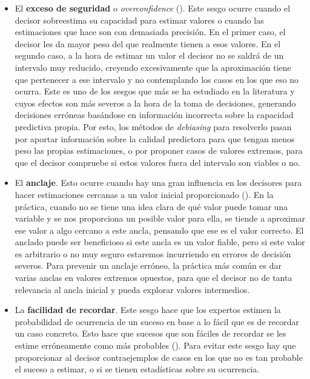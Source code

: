 \documentclass[a4paper,11pt]{article}
\begin{document}
\begin{itemize}
\item El \textbf{exceso de seguridad} o \textit{overconfidence} (\cite{moore2008}). Este sesgo ocurre cuando el decisor sobreestima su capacidad para estimar valores o cuando las estimaciones que hace son con demasiada precisión. En el primer caso, el decisor les da mayor peso del que realmente tienen a esos valores. En el segundo caso, a la hora de estimar un valor el decisor no se saldrá de un intervalo muy reducido, creyendo excesivamente que la aproximación tiene que pertenecer a ese intervalo y no contemplando los casos en los que eso no ocurra. 
Este es uno de los sesgos que más se ha estudiado en la literatura y cuyos efectos son más severos a la hora de la toma de decisiones, generando decisiones erróneas basándose en información incorrecta sobre la capacidad predictiva propia. Por esto, los métodos de \textit{debiasing} para resolverlo pasan por aportar información sobre la calidad predictora para que tengan menos peso las propias estimaciones, o por proponer casos de valores extremos, para que el decisor compruebe si estos valores fuera del intervalo son viables o no.

\item El \textbf{anclaje}. Esto ocurre cuando hay una gran influencia en los decisores para hacer estimaciones cercanas a un valor inicial proporcionado (\cite{chapman2002}). En la práctica, cuando no se tiene una idea clara de qué valor puede tomar una variable y se nos proporciona un posible valor para ella, se tiende a aproximar ese valor a algo cercano a este ancla, pensando que ese es el valor correcto. El anclado puede ser beneficioso si este ancla es un valor fiable, pero si este valor es arbitrario o no muy seguro estaremos incurriendo en errores de decisión severos. Para prevenir un anclaje erróneo, la práctica más común es dar varias anclas en valores extremos opuestos, para que el decisor no de tanta relevancia al ancla inicial y pueda explorar valores intermedios.

\item La \textbf{facilidad de recordar}. Este sesgo hace que los expertos estimen la probabilidad de ocurrencia de un suceso en base a lo fácil que es de recordar un caso concreto. Esto hace que sucesos que son fáciles de recordar se les estime erróneamente como más probables (\cite{buon2008}). Para evitar este sesgo hay que proporcionar al decisor contraejemplos de casos en los que no es tan probable el suceso a estimar, o si se tienen estadísticas sobre su ocurrencia.


\end{itemize}
\end{document}
